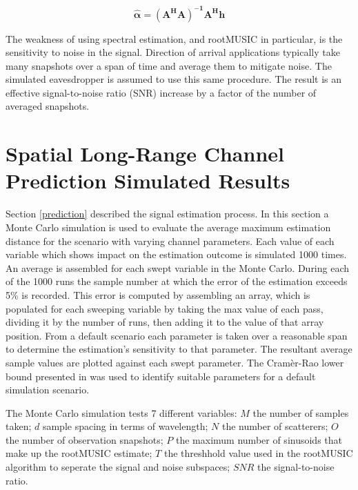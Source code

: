 \documentclass{allertonproc}
\begin{document}
\begin{equation}\label{ahat}
\boldsymbol{\hat{\alpha}}=\boldsymbol{(A^HA)^{-1}A^Hh}
\end{equation}




The weakness of using spectral estimation, and rootMUSIC in particular, is the sensitivity to noise in the signal. Direction of arrival applications typically take many snapshots over a span of time and average them to mitigate noise. The simulated eavesdropper is assumed to use this same procedure. The result is an effective signal-to-noise ratio (SNR) increase by a factor of the number of averaged snapshots. 



\section{Spatial Long-Range Channel Prediction Simulated Results}\label{simresults}

Section \ref{prediction} described the signal estimation process. In this section a Monte Carlo simulation is used to evaluate the average maximum estimation distance for the scenario with varying channel parameters. Each value of each variable which shows impact on the estimation outcome is simulated 1000 times. An average is assembled for each swept variable in the Monte Carlo. During each of the 1000 runs the sample number at which the error of the estimation exceeds 5\% is recorded. This error is computed by assembling an array, which is populated for each sweeping variable by taking the max value of each pass, dividing it by the number of runs, then adding it to the value of that array position. From a default scenario each parameter is taken over a reasonable span to determine the estimation's sensitivity to that parameter. The resultant average sample values are plotted against each swept parameter. The Cram\`er-Rao lower bound presented in \cite{kckpVTC2015} was used to identify suitable parameters for a default simulation scenario.  %

The Monte Carlo simulation tests 7 different variables: $M$ the number of samples taken; $d$ sample spacing in terms of wavelength; $N$ the number of scatterers; $O$ the number of observation snapshots; $P$ the maximum number of sinusoids that make up the rootMUSIC estimate; $T$ the threshhold value used in the rootMUSIC algorithm to seperate the signal and noise subspaces; $SNR$ the signal-to-noise ratio.
\end{document}
